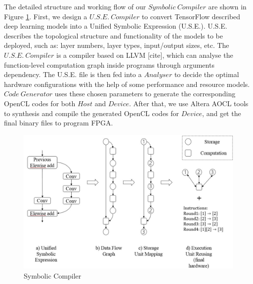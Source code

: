 \documentclass{acm_proc_article-sp-copy}
\begin{document}
The detailed structure and working flow of our $Symbolic\ Compiler$ are shown in Figure \ref{sc}. First, we design a $U.S.E.\ Compiler$ to convert TensorFlow described deep learning models into a Unified Symbolic Expression (U.S.E.). U.S.E. describes the topological structure and functionality of the models to be deployed, such as: layer numbers, layer types, input/output sizes, etc. The $U.S.E.\ Compiler$ is a compiler based on LLVM [cite], which can analyse the function-level computation graph inside programs through arguments dependency. The U.S.E. file is then fed into a $Analyser$ to decide the optimal hardware configurations with the help of some performance and resource models. $Code\ Generator$ uses these chosen parameters to generate the corresponding OpenCL codes for both $Host$ and $Device$. After that, we use Altera AOCL tools to synthesis and compile the generated OpenCL codes for $Device$, and get the final binary files to program FPGA.  

\begin{figure}
	\centering
	\includegraphics[width=1.0\linewidth]{./figure/sc.jpg}
	\caption{Symbolic Compiler}
	\label{sc}
\end{figure}

\end{document}
